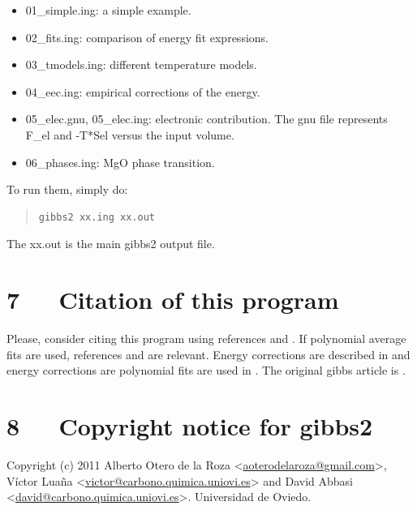 \documentclass[a4paper]{article}
\begin{document}
\begin{itemize}
\item 01\_simple.ing: a simple example.

\item 02\_fits.ing: comparison of energy fit expressions.

\item 03\_tmodels.ing: different temperature models.

\item 04\_eec.ing: empirical corrections of the energy.

\item 05\_elec.gnu, 05\_elec.ing: electronic contribution. The gnu file
represents F\_el and -T*Sel versus the input volume.

\item 06\_phases.ing: MgO phase transition.
\end{itemize}

To run them, simply do:

\begin{quote}
\begin{verbatim}
gibbs2 xx.ing xx.out
\end{verbatim}
\end{quote}

The xx.out is the main gibbs2 output file.


\section{7   Citation of this program%
  \label{citation-of-this-program}%
}

Please, consider citing this program using references \cite{fit1} and
\cite{impl} . If polynomial average fits are used, references \cite{fit1} and
\cite{fit2} are relevant. Energy corrections are described in \cite{corr} and
energy corrections are polynomial fits are used in \cite{rig} . The
original gibbs article is \cite{orig}.


\section{8   Copyright notice for gibbs2%
  \label{copyright-notice-for-gibbs2}%
}

Copyright (c) 2011 Alberto Otero de la Roza <\href{mailto:aoterodelaroza@gmail.com}{aoterodelaroza@gmail.com}>,
Víctor Luaña <\href{mailto:victor@carbono.quimica.uniovi.es}{victor@carbono.quimica.uniovi.es}> and David
Abbasi <\href{mailto:david@carbono.quimica.uniovi.es}{david@carbono.quimica.uniovi.es}>. Universidad de Oviedo.
\end{document}
